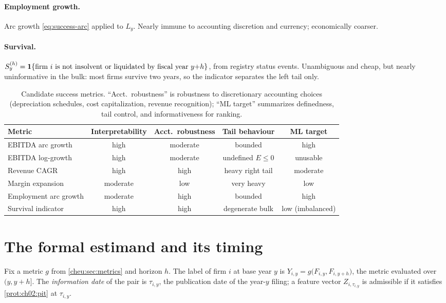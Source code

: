 \paragraph{Employment growth.} Arc growth \cref{eq:success-arc} applied to $L_y$. Nearly immune
to accounting discretion and currency; economically coarser.

\paragraph{Survival.} $S^{(h)}_y = \mathbf{1}\{\text{firm}~i~\text{is not insolvent or liquidated by
fiscal year}~y{+}h\}$, from registry status events. Unambiguous and cheap, but nearly
uninformative in the bulk: most firms survive two years, so the indicator separates the left
tail only.

\begin{table}[htbp]
\centering
\small
\setlength{\tabcolsep}{4pt}
\begin{tabular}{lcccc}
\toprule
Metric & Interpretability & Acct.\ robustness & Tail behaviour & ML
target \\
\midrule
EBITDA arc growth      & high     & moderate & bounded        & high \\
EBITDA log-growth      & high     & moderate & undefined $E \le 0$ &
unusable \\
Revenue CAGR           & high     & high     & heavy right tail &
moderate \\
Margin expansion       & moderate & low      & very heavy      & low \\
Employment arc growth  & moderate & high     & bounded        & high \\
Survival indicator     & high     & high     & degenerate bulk & low
(imbalanced) \\
\bottomrule
\end{tabular}
\caption{Candidate success metrics. ``Acct.\ robustness'' is robustness
to discretionary accounting choices (depreciation schedules, cost
capitalization, revenue recognition); ``ML target'' summarizes
definedness, tail control, and informativeness for ranking.}
\label{cheu:tab:metrics}
\end{table}

\section{The formal estimand and its timing}\label{cheu:sec:estimand}

\begin{definition}\label{def:success-label}
Fix a metric $g$ from \cref{cheu:sec:metrics} and horizon $h$. The label of firm $i$ at base
year $y$ is $Y_{i,y} = g\big(F_{i,y}, F_{i,y+h}\big)$, the metric evaluated over $(y, y+h]$. The
\emph{information date} of the pair is $\tau_{i,y}$, the publication date of the year-$y$
filing; a feature vector $Z_{i,\tau_{i,y}}$ is admissible if it satisfies \cref{prot:ch02:pit}
at $\tau_{i,y}$.
\end{definition}

